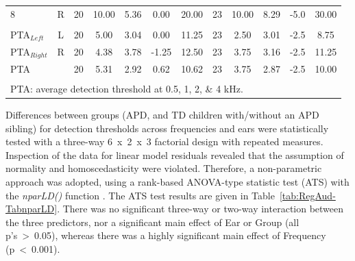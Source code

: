 \documentclass[a4paper, twoside]{templates/ociamthesis}
\begin{document}
\begin{table}
{\begin{tabular}[t]{lcccccc|>{}ccccc}
\hspace{1em}8 & R & 20 & 10.00 & 5.36 & 0.00 & 20.00 & 23 & 10.00 & 8.29 & -5.0 & 30.00\\
\addlinespace[0.3em]
\multicolumn{12}{l}{\textbf{PTAs}}\\
\hspace{1em}PTA$_{Left}$ & L & 20 & 5.00 & 3.04 & 0.00 & 11.25 & 23 & 2.50 & 3.01 & -2.5 & 8.75\\
\hspace{1em}PTA$_{Right}$ & R & 20 & 4.38 & 3.78 & -1.25 & 12.50 & 23 & 3.75 & 3.16 & -2.5 & 11.25\\
\hspace{1em}PTA &  & 20 & 5.31 & 2.92 & 0.62 & 10.62 & 23 & 3.75 & 2.87 & -2.5 & 10.00\\
\bottomrule
\multicolumn{12}{l}{\textsuperscript{} PTA: average detection threshold at 0.5, 1, 2, \& 4 kHz.}\\
\end{tabular}}
\end{table}

Differences between groups (APD, and TD children with/without an APD sibling) for detection thresholds across frequencies and ears were statistically tested with a three-way 6~x~2~x~3 factorial design with repeated measures. Inspection of the data for linear model residuals revealed that the assumption of normality and homoscedasticity were violated. Therefore, a non-parametric approach was adopted, using a rank-based ANOVA-type statistic test (ATS) with the \emph{nparLD()} function \autocite[nparLD package;][]{nparLDPackageR}. The ATS test results are given in Table~\ref{tab:RegAud-TabnparLD}. There was no significant three-way or two-way interaction between the three predictors, nor a significant main effect of Ear or Group (all p's~\textgreater~0.05), whereas there was a highly significant main effect of Frequency (p~\textless~0.001).\\
\end{document}
